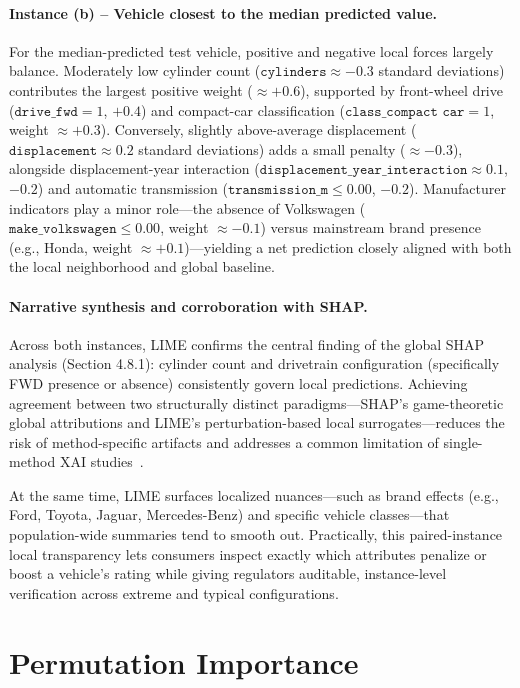 \paragraph{Instance (b) – Vehicle closest to the median predicted value.}
For the median-predicted test vehicle, positive and negative local forces largely balance. Moderately low cylinder count (\(\texttt{cylinders} \approx -0.3\) standard deviations) contributes the largest positive weight (\(\approx +0.6\)), supported by front-wheel drive (\(\texttt{drive\_fwd} = 1\), \(+0.4\)) and compact-car classification (\(\texttt{class\_compact car} = 1\), weight \(\approx +0.3\)). Conversely, slightly above-average displacement (\(\texttt{displacement} \approx 0.2\) standard deviations) adds a small penalty (\(\approx -0.3\)), alongside displacement-year interaction (\(\texttt{displacement\_year\_interaction} \approx 0.1\), \(-0.2\)) and automatic transmission (\(\texttt{transmission\_m} \leq 0.00\), \(-0.2\)). Manufacturer indicators play a minor role---the absence of Volkswagen (\(\texttt{make\_volkswagen} \leq 0.00\), weight \(\approx -0.1\)) versus mainstream brand presence (e.g., Honda, weight \(\approx +0.1\))---yielding a net prediction closely aligned with both the local neighborhood and global baseline.

\paragraph{Narrative synthesis and corroboration with SHAP.}
Across both instances, LIME confirms the central finding of the global SHAP analysis (Section 4.8.1): cylinder count and drivetrain configuration (specifically FWD presence or absence) consistently govern local predictions. Achieving agreement between two structurally distinct paradigms---SHAP's game-theoretic global attributions and LIME's perturbation-based local surrogates---reduces the risk of method-specific artifacts and addresses a common limitation of single-method XAI studies~\cite{mangalathu2020failure}.

At the same time, LIME surfaces localized nuances---such as brand effects (e.g., Ford, Toyota, Jaguar, Mercedes-Benz) and specific vehicle classes---that population-wide summaries tend to smooth out. Practically, this paired-instance local transparency lets consumers inspect exactly which attributes penalize or boost a vehicle's rating while giving regulators auditable, instance-level verification across extreme and typical configurations.


\section{Permutation Importance}

